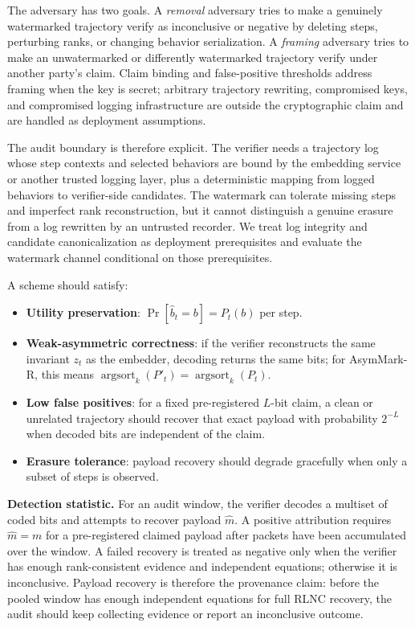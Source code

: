 \documentclass[conference,compsoc]{IEEEtran}
\newcommand{\ours}{AsymMark-R}
\begin{document}
The adversary has two goals. A \emph{removal} adversary tries to make a genuinely watermarked trajectory verify as inconclusive or negative by deleting steps, perturbing ranks, or changing behavior serialization. A \emph{framing} adversary tries to make an unwatermarked or differently watermarked trajectory verify under another party's claim. Claim binding and false-positive thresholds address framing when the key is secret; arbitrary trajectory rewriting, compromised keys, and compromised logging infrastructure are outside the cryptographic claim and are handled as deployment assumptions.

The audit boundary is therefore explicit. The verifier needs a trajectory log whose step contexts and selected behaviors are bound by the embedding service or another trusted logging layer, plus a deterministic mapping from logged behaviors to verifier-side candidates. The watermark can tolerate missing steps and imperfect rank reconstruction, but it cannot distinguish a genuine erasure from a log rewritten by an untrusted recorder. We treat log integrity and candidate canonicalization as deployment prerequisites and evaluate the watermark channel conditional on those prerequisites.

A scheme should satisfy:
\begin{itemize}[leftmargin=*]
  \item \textbf{Utility preservation}: $\Pr[\hat b_t=b]=P_t(b)$ per step.
  \item \textbf{Weak-asymmetric correctness}: if the verifier reconstructs the same invariant $z_t$ as the embedder, decoding returns the same bits; for \ours{}, this means $\operatorname{argsort}_k(P'_t)=\operatorname{argsort}_k(P_t)$.
  \item \textbf{Low false positives}: for a fixed pre-registered $L$-bit claim, a clean or unrelated trajectory should recover that exact payload with probability $2^{-L}$ when decoded bits are independent of the claim.
  \item \textbf{Erasure tolerance}: payload recovery should degrade gracefully when only a subset of steps is observed.
\end{itemize}

\textbf{Detection statistic.}
For an audit window, the verifier decodes a multiset of coded bits and attempts to recover payload $\hat m$. A positive attribution requires $\hat m=m$ for a pre-registered claimed payload after packets have been accumulated over the window. A failed recovery is treated as negative only when the verifier has enough rank-consistent evidence and independent equations; otherwise it is inconclusive. Payload recovery is therefore the provenance claim: before the pooled window has enough independent equations for full RLNC recovery, the audit should keep collecting evidence or report an inconclusive outcome.
\end{document}
